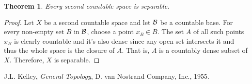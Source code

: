 \documentclass{article}
\newtheorem{thm}{Theorem}
\begin{document}
\begin{thm} \cite{kelley}
  Every second countable space is separable.
\end{thm}


\begin{proof}
Let $X$ be a second countable space and let $\cal B$ be a countable base.
For every non-empty set $B$ in $\cal B$, choose a point $x_B\in B$. The set $A$ 
of all such points $x_B$ is clearly countable and it's also dense 
since any open set intersects it and thus the whole space is the closure of $A$.
That is, $A$ is a countably dense subset of $X$. Therefore, $X$ is separable.
\end{proof}

\begin{thebibliography}{9}
J.L. Kelley, \emph{General Topology}, D. van Nostrand Company, Inc., 1955.
\end{thebibliography}
\end{document}
